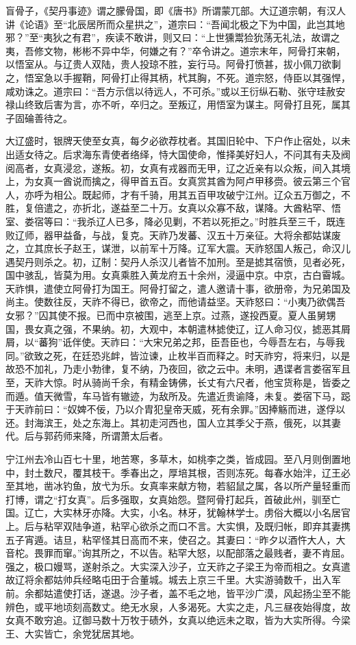 \documentclass[]{article}
\begin{document}
盲骨子，《契丹事迹》谓之朦骨国，即《唐书》所谓蒙兀部。大辽道宗朝，有汉人讲《论语》至``北辰居所而众星拱之''，道宗曰：``吾闻北极之下为中国，此岂其地邪？''至``夷狄之有君''，疾读不敢讲，则又曰：``上世獯鬻猃狁荡无礼法，故谓之夷，吾修文物，彬彬不异中华，何嫌之有？''卒令讲之。道宗末年，阿骨打来朝，以悟室从。与辽贵人双陆，贵人投琼不胜，妄行马。阿骨打愤甚，拔小佩刀欲剚之，悟室急以手握鞘，阿骨打止得其柄，杙其胸，不死。道宗怒，侍臣以其强悍，咸劝诛之。道宗曰：``吾方示信以待远人，不可杀。''或以王衍纵石勒、张守珪赦安禄山终致后害为言，亦不听，卒归之。至叛辽，用悟室为谋主。阿骨打且死，属其子固碖善待之。

大辽盛时，银牌天使至女真，每夕必欲荐枕者。其国旧轮中、下户作止宿处，以未出适女待之。后求海东青使者络绎，恃大国使命，惟择美好妇人，不问其有夫及阀阅高者，女真浸忿，遂叛。初，女真有戎器而无甲，辽之近亲有以众叛，间入其境上，为女真一酋说而擒之，得甲首五百。女真赏其酋为阿卢甲移赍。彼云第三个官人，亦呼为相公。既起师，才有千骑，用其五百甲攻破宁江州。辽众五万御之，不胜，复倍遣之，亦折北，遂益至二十万。女真以众寡不敌，谋降。大酋粘罕、悟室、娄宿等曰：``我杀辽人已多，降必见剿，不若以死拒之。''时胜兵至三千，既连败辽师，器甲益备，与战，复克。天祚乃发蕃、汉五十万亲征。大将余都姑谋废之，立其庶长子赵王，谋泄，以前军十万降。辽军大震。天祚怒国人叛己，命汉儿遇契丹则杀之。初，辽制：契丹人杀汉儿者皆不加刑。至是摅其宿愤，见者必死，国中骇乱，皆莫为用。女真乘胜入黄龙府五十余州，浸逼中京。中京，古白霫城。天祚惧，遣使立阿骨打为国王。阿骨打留之，遣人邀请十事，欲册帝，为兄弟国及尚主。使数往反，天祚不得已，欲帝之，而他请益坚。天祚怒曰：``小夷乃欲偶吾女邪？''囚其使不报。已而中京被围，逃至上京。过燕，遂投西夏。夏人虽舅甥国，畏女真之强，不果纳。初，大观中，本朝遣林摅使辽，辽人命习仪，摅恶其屑屑，以``蕃狗''诋伴使。天祚曰：``大宋兄弟之邦，臣吾臣也，今辱吾左右，与辱我同。''欲致之死，在廷恐兆衅，皆泣谏，止枚半百而释之。时天祚穷，将来归，以是故恐不加礼，乃走小勃律，复不纳，乃夜回，欲之云中。未明，遇谍者言娄宿军且至，天祚大惊。时从骑尚千余，有精金铸佛，长丈有六尺者，他宝货称是，皆委之而遁。值天微雪，车马皆有辙迹，为敌所及。先遣近贵谕降，未复。娄宿下马，跽于天祚前曰：``奴婢不佞，乃以介胄犯皇帝天威，死有余罪。''因捧觞而进，遂俘以还。封海滨王，处之东海上。其初走河西也，国人立其季父于燕，俄死，以其妻代。后与郭药师来降，所谓萧太后者。

宁江州去冷山百七十里，地苦寒，多草木，如桃李之类，皆成园。至八月则倒置地中，封土数尺，覆其枝干。季春出之，厚培其根，否则冻死。每春水始泮，辽王必至其地，凿冰钓鱼，放弋为乐。女真率来献方物，若貂鼠之属，各以所产量轻重而打博，谓之``打女真''。后多强取，女真始怨。暨阿骨打起兵，首破此州，驯至亡国。辽亡，大实林牙亦降。大实，小名。林牙，犹翰林学士。虏俗大概以小名居官上。后与粘罕双陆争道，粘罕心欲杀之而口不言。大实惧，及既归帐，即弃其妻携五子宵遁。诘旦，粘罕怪其日高而不来，使召之。其妻曰：``昨夕以酒忤大人，大音柁。畏罪而窜。''询其所之，不以告。粘罕大怒，以配部落之最贱者，妻不肯屈。强之，极口嫚骂，遂射杀之。大实深入沙子，立天祚之子梁王为帝而相之。女真遣故辽将余都姑帅兵经略屯田于合董城。城去上京三千里。大实游骑数千，出入军前。余都姑遣使打话，遂退。沙子者，盖不毛之地，皆平沙广漠，风起扬尘至不能辨色，或平地顷刻高数丈。绝无水泉，人多渴死。大实之走，凡三昼夜始得度，故女真不敢穷追。辽御马数十万牧于碛外，女真以绝远未之取，皆为大实所得。今梁王、大实皆亡，余党犹居其地。
\end{document}
